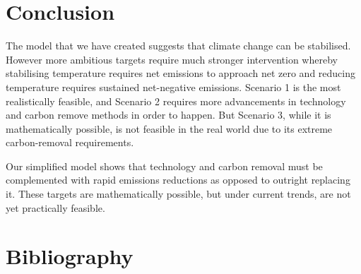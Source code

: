 \documentclass[12pt]{article}
\begin{document}
\section{Conclusion}

The model that we have created suggests that climate change can be stabilised.
However more ambitious targets require much stronger intervention whereby stabilising temperature requires net emissions to approach net zero
and reducing temperature requires sustained net-negative emissions.
Scenario 1 is the most realistically feasible, and Scenario 2 requires more advancements in technology and carbon remove methods in order to happen.
But Scenario 3, while it is mathematically possible, is not feasible in the real world due to its extreme carbon-removal requirements.

Our simplified model shows that technology and carbon removal must be complemented with rapid emissions reductions
as opposed to outright replacing it.
These targets are mathematically possible, but under current trends, are not yet practically feasible.  


\section{Bibliography}

\begingroup
\nocite{*}
\renewcommand{\section}[2]{}	%
\printbibliography
\endgroup
\end{document}
